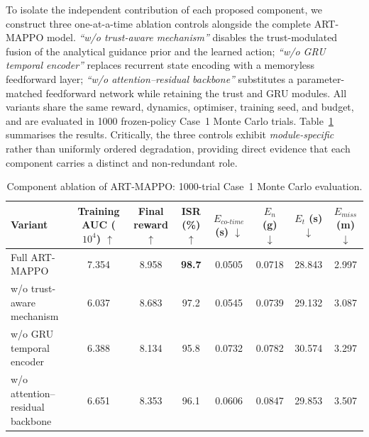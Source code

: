 \documentclass[lettersize,journal]{IEEEtran}
\newcommand{\hladd}[1]{{\color{blue}#1}}
\begin{document}
\hladd{To isolate the independent contribution of each proposed component, we construct three
one-at-a-time ablation controls alongside the complete ART-MAPPO model.
\emph{``w/o trust-aware mechanism''} disables the trust-modulated fusion of the analytical
guidance prior and the learned action; \emph{``w/o GRU temporal encoder''} replaces recurrent
state encoding with a memoryless feedforward layer; \emph{``w/o attention--residual backbone''}
substitutes a parameter-matched feedforward network while retaining the trust and GRU modules.
All variants share the same reward, dynamics, optimiser, training seed, and budget, and are
evaluated in 1000 frozen-policy Case~1 Monte Carlo trials.  Table~\ref{tab:ablation_case1}
summarises the results.  Critically, the three controls exhibit \emph{module-specific} rather
than uniformly ordered degradation, providing direct evidence that each component carries a
distinct and non-redundant role.}

\begin{table}[!t]
\centering
\color{blue}
\scriptsize
\caption{Component ablation of ART-MAPPO: 1000-trial Case~1 Monte Carlo evaluation.}
\label{tab:ablation_case1}
\renewcommand{\arraystretch}{1.12}
\setlength{\tabcolsep}{3.5pt}
\begin{tabular}{lccccccc}
\toprule
Variant
  & Training AUC ($10^4$) $\uparrow$
  & Final reward $\uparrow$
  & ISR (\%) $\uparrow$
  & $E_{co\text{-}time}$ (s) $\downarrow$
  & $E_n$ (g) $\downarrow$
  & $E_t$ (s) $\downarrow$
  & $E_{miss}$ (m) $\downarrow$ \\
\midrule
Full ART-MAPPO                   & 7.354 & 8.958 & \textbf{98.7} & 0.0505 & 0.0718 & 28.843 & 2.997 \\
w/o trust-aware mechanism        & 6.037 & 8.683 & 97.2          & 0.0545 & 0.0739 & 29.132 & 3.087 \\
w/o GRU temporal encoder         & 6.388 & 8.134 & 95.8          & 0.0732 & 0.0782 & 30.574 & 3.297 \\
w/o attention--residual backbone & 6.651 & 8.353 & 96.1          & 0.0606 & 0.0847 & 29.853 & 3.507 \\
\bottomrule
\end{tabular}
\end{table}
\end{document}
